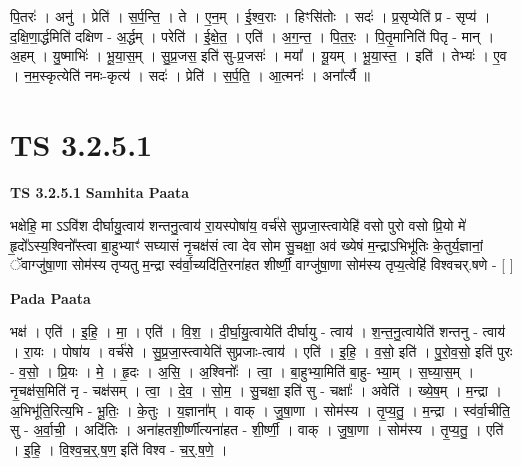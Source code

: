\documentclass[17pt]{extarticle}
\begin{document}
पि॒तरः॑ । अनु॑ । प्रेति॑ । स॒र्प॒न्ति॒ । ते । ए॒न॒म् । ई॒श्व॒राः । हिꣳसि॑तोः । सदः॑ । प्र॒सृप्येति॑ प्र - सृप्य॑ । द॒क्षि॒णा॒र्द्धमिति॑ दक्षिण - अ॒र्द्धम् । परेति॑ । ई॒क्षे॒त॒ । एति॑ । अ॒ग॒न्त॒ । पि॒त॒रः॒ । पि॒तृ॒मानिति॑ पितृ - मान् । अ॒हम् । यु॒ष्माभिः॑ । भू॒या॒स॒म् । सु॒प्र॒जस॒ इति॑ सु-प्र॒जसः॑ । मया᳚ । यू॒यम् । भू॒या॒स्त॒ । इति॑ । तेभ्यः॑ । ए॒व । न॒म॒स्कृत्येति॑ नमः-कृत्य॑ । सदः॑ । प्रेति॑ । स॒र्प॒ति॒ । आ॒त्मनः॑ । अना᳚र्त्यै ॥  \newline





\section{ TS 3.2.5.1 }

\textbf{TS 3.2.5.1 } \newline
\textbf{Samhita Paata} \newline

भक्षेहि॒ मा ऽऽवि॑श दीर्घायु॒त्वाय॑ शन्तनु॒त्वाय॑ रा॒यस्पोषा॑य॒ वर्च॑से सुप्रजा॒स्त्वायेहि॑ वसो पुरो वसो प्रि॒यो मे॑ हृ॒दो᳚ऽस्य॒श्विनो᳚स्त्वा बा॒हुभ्याꣳ॑ सघ्यासं नृ॒चक्ष॑सं त्वा देव सोम सु॒चक्षा॒ अव॑ ख्येषं म॒न्द्राऽभिभू॑तिः के॒तुर्य॒ज्ञानां॒ ॅवाग्जु॑षा॒णा सोम॑स्य तृप्यतु म॒न्द्रा स्व॑र्वा॒च्यदि॑ति॒रना॑हत शीर्ष्णी॒ वाग्जु॑षा॒णा सोम॑स्य तृप्य॒त्वेहि॑ विश्वचर्.षणे - [  ] \newline

\textbf{Pada Paata} \newline

भक्ष॑ । एति॑ । इ॒हि॒ । मा॒ । एति॑ । वि॒श॒ । दी॒र्घा॒यु॒त्वायेति॑ दीर्घायु - त्वाय॑ । श॒न्त॒नु॒त्वायेति॑ शन्तनु - त्वाय॑ । रा॒यः । पोषा॑य । वर्च॑से । सु॒प्र॒जा॒स्त्वायेति॑ सुप्रजाः-त्वाय॑ । एति॑ । इ॒हि॒ । व॒सो॒ इति॑ । पु॒रो॒व॒सो॒ इति॑ पुरः - व॒सो॒ । प्रि॒यः । मे॒ । हृ॒दः । अ॒सि॒ । अ॒श्विनोः᳚ । त्वा॒ । बा॒हुभ्या॒मिति॑ बा॒हु- भ्या॒म् । स॒घ्या॒स॒म् । नृ॒चक्ष॑स॒मिति॑ नृ - चक्ष॑सम् । त्वा॒ । दे॒व॒ । सो॒म॒ । सु॒चक्षा॒ इति॑ सु - चक्षाः᳚ । अवेति॑ । ख्ये॒ष॒म् । म॒न्द्रा । अ॒भिभू॑ति॒रित्य॒भि - भू॒तिः॒ । के॒तुः । य॒ज्ञाना᳚म् । वाक् । जु॒षा॒णा । सोम॑स्य । तृ॒प्य॒तु॒ । म॒न्द्रा । स्व॑र्वा॒चीति॒ सु - अ॒र्वा॒ची॒ । अदि॑तिः । अना॑हतशी॒र्ष्णीत्यना॑हत - शी॒र्ष्णी॒ । वाक् । जु॒षा॒णा । सोम॑स्य । तृ॒प्य॒तु॒ । एति॑ । इ॒हि॒ । वि॒श्व॒च॒र्॒.ष॒ण॒ इति॑ विश्व - च॒र्॒.ष॒णे॒ ।  \newline




\end{document}
